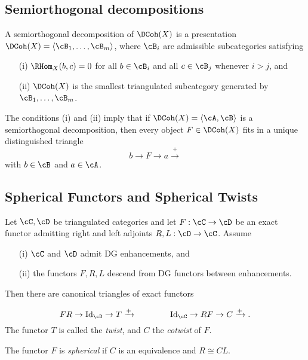 \subsection{Semiorthogonal decompositions} \label{S:SOD}

A semiorthogonal decomposition of $\DCoh(X)$ is a presentation $\DCoh(X) = \langle \cB_1, \ldots, \cB_m \rangle$, where $\cB_i$ are admissible subcategories satisfying
\begin{enumerate}
    \item[(i)] $\RHom_X(b, c) = 0$ for all $b \in \cB_i$ and all $c \in \cB_j$ whenever $i > j$, and
    \item[(ii)] $\DCoh(X)$ is the smallest triangulated subcategory generated by $\cB_1,\ldots, \cB_m$.
\end{enumerate}
The conditions (i) and (ii) imply that if $\DCoh(X) = \langle \cA, \cB \rangle$ is a semiorthogonal decomposition, then every object $F \in \DCoh(X)$ fits in a unique distinguished triangle
\begin{equation*}
    b \to F \to a  \xrightarrow{+   }  \label{eq:triangle_of_sod}
\end{equation*}
with $b \in \cB$ and $a \in \cA$. 

\subsection{Spherical Functors and Spherical Twists}

Let $\cC, \cD$ be triangulated categories and let $F:\cC \to \cD$ be an exact functor admitting right and left adjoints $R,L:\cD \to \cC$. Assume 
\begin{itemize}
    \item [(i)] $\cC$ and $\cD$ admit DG enhancements, and 
    \item [(ii)] the functors $F,R,L$ descend from DG functors between enhancements. 
\end{itemize}
Then there are canonical triangles \cite{AL17} of exact functors

\[
 FR \to \textrm{Id}_\cD \to T  \xrightarrow{+   } \qquad \qquad \textrm{Id}_\cC \to RF \to C  \xrightarrow{+   } .
\]
The functor $T$ is called the \emph{twist}, and $C$ the \emph{cotwist} of $F$.

\begin{defn}[\cites{AL17,A16}]
    The functor $F$ is \emph{spherical} if $C$ is an equivalence and $R\cong CL$. 
\end{defn}


